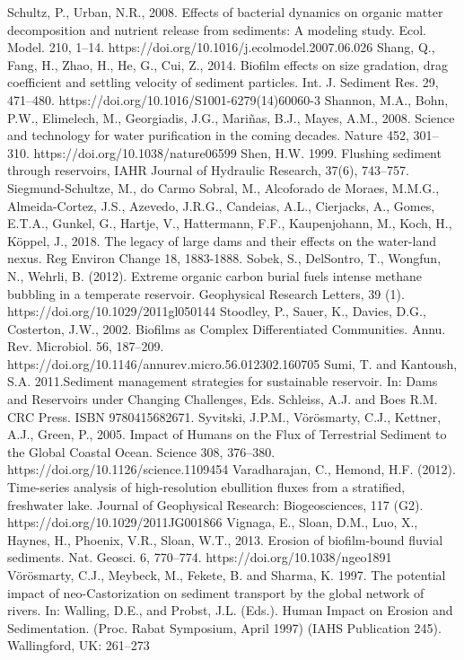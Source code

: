 \begin{thebibliography}{}
Schultz, P., Urban, N.R., 2008. Effects of bacterial dynamics on organic matter decomposition and nutrient release from sediments: A modeling study. Ecol. Model. 210, 1–14. https://doi.org/10.1016/j.ecolmodel.2007.06.026
Shang, Q., Fang, H., Zhao, H., He, G., Cui, Z., 2014. Biofilm effects on size gradation, drag coefficient and settling velocity of sediment particles. Int. J. Sediment Res. 29, 471–480. https://doi.org/10.1016/S1001-6279(14)60060-3
Shannon, M.A., Bohn, P.W., Elimelech, M., Georgiadis, J.G., Mariñas, B.J., Mayes, A.M., 2008. Science and technology for water purification in the coming decades. Nature 452, 301–310. https://doi.org/10.1038/nature06599
Shen, H.W. 1999. Flushing sediment through reservoirs, IAHR Journal of Hydraulic Research, 37(6), 743–757.
Siegmund-Schultze, M., do Carmo Sobral, M., Alcoforado de Moraes, M.M.G., Almeida-Cortez, J.S., Azevedo, J.R.G., Candeias, A.L., Cierjacks, A., Gomes, E.T.A., Gunkel, G., Hartje, V., Hattermann, F.F., Kaupenjohann, M., Koch, H., Köppel, J., 2018. The legacy of large dams and their effects on the water-land nexus. Reg Environ Change 18, 1883-1888.
Sobek, S., DelSontro, T., Wongfun, N., Wehrli, B. (2012). Extreme organic carbon burial fuels intense methane bubbling in a temperate reservoir. Geophysical Research Letters, 39 (1). https://doi.org/10.1029/2011gl050144
Stoodley, P., Sauer, K., Davies, D.G., Costerton, J.W., 2002. Biofilms as Complex Differentiated Communities. Annu. Rev. Microbiol. 56, 187–209. https://doi.org/10.1146/annurev.micro.56.012302.160705
Sumi, T. and Kantoush, S.A. 2011.Sediment management strategies for sustainable reservoir. In: Dams and Reservoirs under Changing Challenges, Eds. Schleiss, A.J. and Boes R.M. CRC Press. ISBN 9780415682671.
Syvitski, J.P.M., Vörösmarty, C.J., Kettner, A.J., Green, P., 2005. Impact of Humans on the Flux of Terrestrial Sediment to the Global Coastal Ocean. Science 308, 376–380. https://doi.org/10.1126/science.1109454
Varadharajan, C., Hemond, H.F. (2012). Time-series analysis of high-resolution ebullition fluxes from a stratified, freshwater lake. Journal of Geophysical Research: Biogeosciences, 117 (G2). https://doi.org/10.1029/2011JG001866
Vignaga, E., Sloan, D.M., Luo, X., Haynes, H., Phoenix, V.R., Sloan, W.T., 2013. Erosion of biofilm-bound fluvial sediments. Nat. Geosci. 6, 770–774. https://doi.org/10.1038/ngeo1891
Vörösmarty, C.J., Meybeck, M., Fekete, B. and Sharma, K. 1997. The potential impact of neo-Castorization on sediment transport by the global network of rivers. In: Walling, D.E., and Probst, J.L. (Eds.). Human Impact on Erosion and Sedimentation. (Proc. Rabat Symposium, April 1997) (IAHS Publication 245). Wallingford, UK: 261–273

\end{thebibliography}
